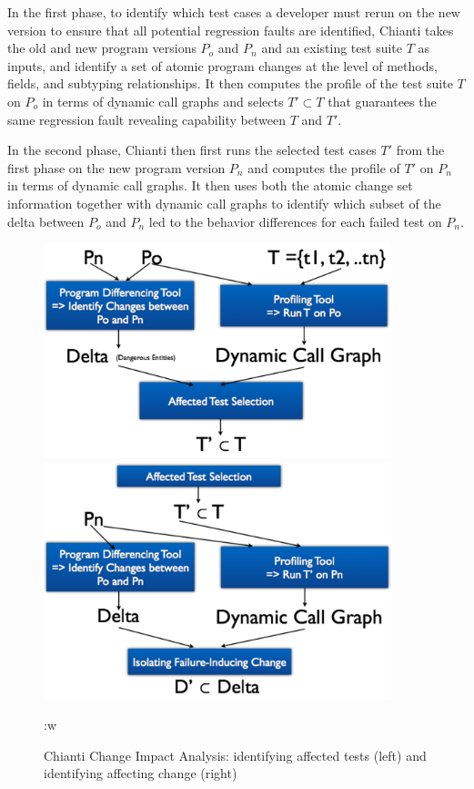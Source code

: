 In the first phase, to identify which test cases a developer must rerun on the new version to ensure that all potential regression faults are identified, Chianti takes the old and new program versions $P_o$ and $P_n$ and an existing test suite $T$ as inputs, and identify a set of atomic program changes at the level of methods, fields, and subtyping relationships. It then computes the profile of the test suite $T$ on $P_o$ in terms of dynamic call graphs and selects $T'\subset T$ that guarantees the same regression fault revealing capability between $T$ and $T'$. 

In the second phase, Chianti then first runs the selected test cases $T'$ from the first phase on the new program version $P_n$ and computes the profile of $T'$ on $P_n$ in terms of dynamic call graphs. It then uses both the atomic change set information together with dynamic call graphs to identify which subset of the delta between $P_o$ and $P_n$ led to the behavior differences for each failed test on $P_n$. 

\begin{figure}
\centering
\begin{minipage}{.45\textwidth}
  \centering
\includegraphics[width=0.9\textwidth]{images/ChiantiPhase1.pdf}
\end{minipage}
\begin{minipage}{.45\textwidth}
  \centering
\includegraphics[width=0.9\textwidth]{images/ChiantiPhase2.pdf}
\end{minipage}:w

\caption{Chianti Change Impact Analysis: identifying affected tests (left) and identifying affecting change (right)~\cite{Ren2004}} 
\label{fig:twophase} 
\end{figure}

